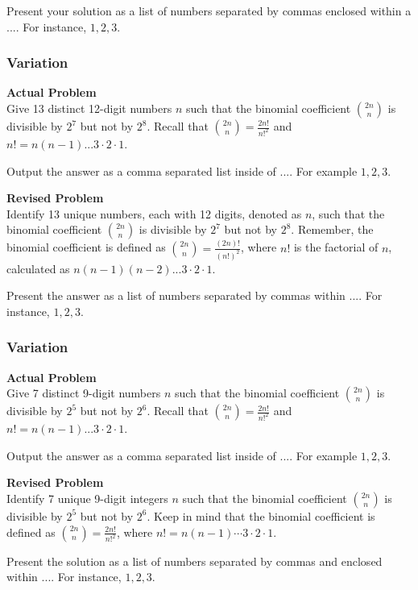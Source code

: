 Present your solution as a list of numbers separated by commas enclosed within a \(\boxed{...}\). For instance, \(\boxed{1, 2, 3}\).

\subsubsection{Variation}
\textbf{Actual Problem}\\
Give 13 distinct 12-digit numbers $n$ such that the binomial coefficient $\binom{2n}{n}$ is divisible by $2^{7}$ but not by $2^{8}$. Recall that $\binom{2n}{n} = \frac{2n!}{n!^2}$ and $n! = n(n-1)...3\cdot 2 \cdot 1$.

Output the answer as a comma separated list inside of $\boxed{...}$. For example $\boxed{1, 2, 3}$.

\textbf{Revised Problem}\\
Identify 13 unique numbers, each with 12 digits, denoted as $n$, such that the binomial coefficient $\binom{2n}{n}$ is divisible by $2^{7}$ but not by $2^{8}$. Remember, the binomial coefficient is defined as $\binom{2n}{n} = \frac{(2n)!}{(n!)^2}$, where $n!$ is the factorial of $n$, calculated as $n(n-1)(n-2)...3 \cdot 2 \cdot 1$.

Present the answer as a list of numbers separated by commas within $\boxed{...}$. For instance, $\boxed{1, 2, 3}$.

\subsubsection{Variation}
\textbf{Actual Problem}\\
Give 7 distinct 9-digit numbers $n$ such that the binomial coefficient $\binom{2n}{n}$ is divisible by $2^{5}$ but not by $2^{6}$. Recall that $\binom{2n}{n} = \frac{2n!}{n!^2}$ and $n! = n(n-1)...3\cdot 2 \cdot 1$.

Output the answer as a comma separated list inside of $\boxed{...}$. For example $\boxed{1, 2, 3}$.

\textbf{Revised Problem}\\
Identify 7 unique 9-digit integers $n$ such that the binomial coefficient $\binom{2n}{n}$ is divisible by $2^{5}$ but not by $2^{6}$. Keep in mind that the binomial coefficient is defined as $\binom{2n}{n} = \frac{2n!}{n!^2}$, where $n! = n(n-1)\cdots3\cdot2\cdot1$.

Present the solution as a list of numbers separated by commas and enclosed within $\boxed{...}$. For instance, $\boxed{1, 2, 3}$.


